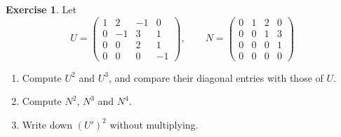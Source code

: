 \documentclass[12pt]{article}
\theoremstyle{definition}
\newtheorem{exercise}{Exercise}
\begin{document}
\begin{exercise}\label{r1-dr-powers}
Let
\[
U=\begin{pmatrix}1&2&-1&0\\0&-1&3&1\\0&0&2&1\\0&0&0&-1\end{pmatrix},\qquad
N=\begin{pmatrix}0&1&2&0\\0&0&1&3\\0&0&0&1\\0&0&0&0\end{pmatrix}
\]
\begin{enumerate}
\item Compute \(U^2\) and \(U^3\), and compare their diagonal entries with those of \(U\).
\item Compute \(N^2\), \(N^3\) and \(N^4\).
\item Write down \((U')^2\) without multiplying.
\end{enumerate}
\end{exercise}
\end{document}
